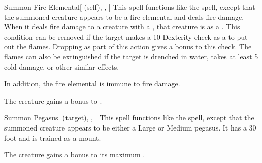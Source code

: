 \lowercase{\hypertarget{spell:Summon Fire Elemental}{}}\label{spell:Summon Fire Elemental}
\begin{attuneability}[Rank 5]{\hypertarget{spell:Summon Fire Elemental}{Summon Fire Elemental}}[ (self), , ]
This spell functions like the  spell, except that the summoned creature appears to be a fire elemental and deals fire damage.
When it deals fire damage to a creature with a , that creature is  as a .
This condition can be removed if the target makes a  10 Dexterity check as a  to put out the flames.
Dropping  as part of this action gives a  bonus to this check.
The flames can also be extinguished if the target is drenched in water, takes at least 5 cold damage, or other similar effects.

In addition, the fire elemental is immune to fire damage.

\rankline
{} The creature gains a  bonus to .
\end{attuneability}
\vspace{0.25em}



\lowercase{\hypertarget{spell:Summon Pegasus}{}}\label{spell:Summon Pegasus}
\begin{attuneability}[Rank 5]{\hypertarget{spell:Summon Pegasus}{Summon Pegasus}}[ (target), , ]
This spell functions like the  spell, except that the summoned creature appears to be either a Large or Medium pegasus.
It has a 30 foot  and is trained as a mount.

\rankline
{} The creature gains a  bonus to its maximum .
\end{attuneability}
\vspace{0.25em}



